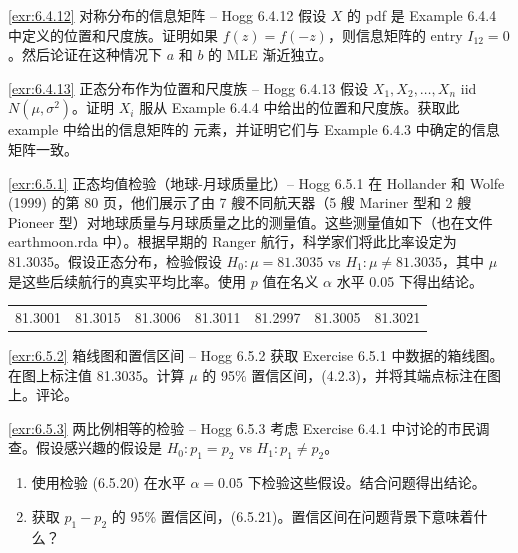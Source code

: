 \begin{exercise}{\ref{exr:6.4.12} 对称分布的信息矩阵 – Hogg 6.4.12}\label{exr:6.4.12}
假设 $X$ 的 pdf 是 Example 6.4.4 中定义的位置和尺度族。证明如果 $f(z) = f(-z)$，则信息矩阵的 entry $I_{12}=0$。然后论证在这种情况下 $a$ 和 $b$ 的 MLE 渐近独立。
\end{exercise}

\begin{exercise}{\ref{exr:6.4.13} 正态分布作为位置和尺度族 – Hogg 6.4.13}\label{exr:6.4.13}
假设 $X_1, X_2, \ldots, X_n$ iid $N(\mu,\sigma^2)$。证明 $X_i$ 服从 Example 6.4.4 中给出的位置和尺度族。获取此 example 中给出的信息矩阵的 元素，并证明它们与 Example 6.4.3 中确定的信息矩阵一致。
\end{exercise}


\begin{exercise}{\ref{exr:6.5.1} 正态均值检验（地球-月球质量比）– Hogg 6.5.1}\label{exr:6.5.1}
在 Hollander 和 Wolfe (1999) 的第 80 页，他们展示了由 7 艘不同航天器（5 艘 Mariner 型和 2 艘 Pioneer 型）对地球质量与月球质量之比的测量值。这些测量值如下（也在文件 earthmoon.rda 中）。根据早期的 Ranger 航行，科学家们将此比率设定为 81.3035。假设正态分布，检验假设 $H_0: \mu = 81.3035$ vs $H_1: \mu \neq 81.3035$，其中 $\mu$ 是这些后续航行的真实平均比率。使用 $p$ 值在名义 $\alpha$ 水平 0.05 下得出结论。

\begin{center}
\begin{tabular}{ccccccc}
81.3001 & 81.3015 & 81.3006 & 81.3011 & 81.2997 & 81.3005 & 81.3021
\end{tabular}
\end{center}
\end{exercise}

\begin{exercise}{\ref{exr:6.5.2} 箱线图和置信区间 – Hogg 6.5.2}\label{exr:6.5.2}
获取 Exercise 6.5.1 中数据的箱线图。在图上标注值 81.3035。计算 $\mu$ 的 95\% 置信区间，(4.2.3)，并将其端点标注在图上。评论。
\end{exercise}

\begin{exercise}{\ref{exr:6.5.3} 两比例相等的检验 – Hogg 6.5.3}\label{exr:6.5.3}
考虑 Exercise 6.4.1 中讨论的市民调查。假设感兴趣的假设是 $H_0: p_1 = p_2$ vs $H_1: p_1 \neq p_2$。

\begin{enumerate}
\item[(a)] 使用检验 (6.5.20) 在水平 $\alpha=0.05$ 下检验这些假设。结合问题得出结论。
\item[(b)] 获取 $p_1 - p_2$ 的 95\% 置信区间，(6.5.21)。置信区间在问题背景下意味着什么？
\end{enumerate}
\end{exercise}

